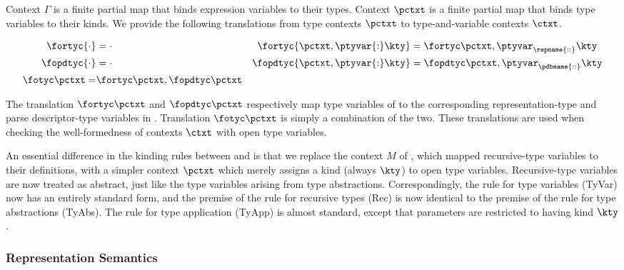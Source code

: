 Context $\Gamma$ is a finite partial map that binds expression
variables to their types.
Context $\pctxt$ is a finite partial map that binds type
variables to their kinds. We provide the following translations from
type contexts $\pctxt$ to \fomega type-and-variable contexts $\ctxt$.

\begin{align*}
\fortyc {\cdot} &= \cdot &
\fortyc {\pctxt,\ptyvar{:}\kty} &= \fortyc \pctxt, \ptyvar_\repname
{\mathrel{::}} \kty \\
\fopdtyc {\cdot} &= \cdot &
\fopdtyc {\pctxt,\ptyvar{:}\kty} &= \fopdtyc \pctxt, \ptyvar_\pdbname
{\mathrel{::}} \kty \\
\fotyc \pctxt =& \fortyc \pctxt, \fopdtyc \pctxt
\end{align*}

The translation $\fortyc \pctxt$ and $\fopdtyc \pctxt$ respectively map type
variables of \ddc{} to the corresponding representation-type and parse
descriptor-type variables in \fomega. Translation
$\fotyc \pctxt$ is simply a combination of the two.  These
translations are used when checking the well-formedness of contexts
$\ctxt$ with open type variables.

An essential difference in the kinding rules between \ddcold{} and
\ddc{} is that we replace the context $M$ of \ddcold{}, which mapped
recursive-type variables to their definitions, with a simpler context
$\pctxt$ which merely assigns a kind (always $\kty$) to open type
variables. Recursive-type variables are now treated as abstract, just
like the type variables arising from type abstractions.
Correspondingly, the rule for type variables (TyVar) now has an
entirely standard form, and the premise of the rule for recursive types
(Rec) is now identical to the premise of the rule for type abstractions
(TyAbs). The rule for type application (TyApp) is almost standard,
except that parameters are restricted to having kind $\kty$. 

\subsubsection{Representation Semantics}
\label{sec:intty-sem}

